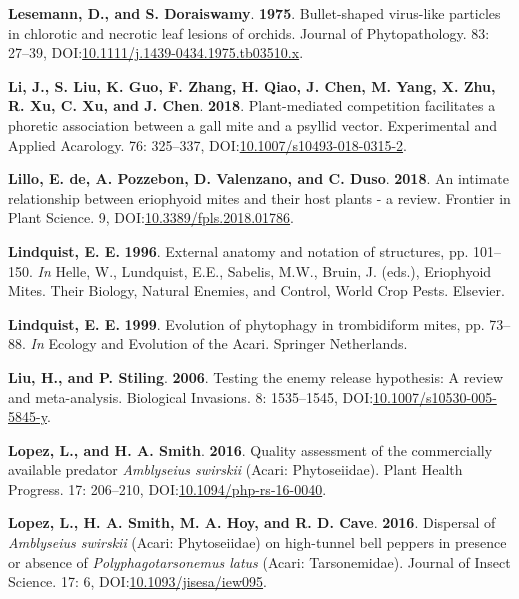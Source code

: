 \documentclass[12pt,final,CPage]{ufthesis}
\newlength{\cslhangindent}
\newenvironment{CSLReferences}[2] %
{%
	\setlength{\parindent}{0pt}
	\ifodd #1 \everypar{\setlength{\hangindent}{\cslhangindent}}\ignorespaces\fi
	\ifnum #2 > 0
	\setlength{\parskip}{#2\baselineskip}
	\fi
}%
{}
\begin{document}
{\begin{CSLReferences}{1}{0}
  \leavevmode{}%
  \textbf{Lesemann, D., and S. Doraiswamy}. \textbf{1975}. Bullet-shaped virus-like particles in chlorotic and necrotic leaf lesions of orchids. Journal of Phytopathology. 83: 27--39, DOI:\href{https://doi.org/10.1111/j.1439-0434.1975.tb03510.x}{10.1111/j.1439-0434.1975.tb03510.x}.

  \leavevmode{}%
  \textbf{Li, J., S. Liu, K. Guo, F. Zhang, H. Qiao, J. Chen, M. Yang, X. Zhu, R. Xu, C. Xu, and J. Chen}. \textbf{2018}. Plant-mediated competition facilitates a phoretic association between a gall mite and a psyllid vector. Experimental and Applied Acarology. 76: 325--337, DOI:\href{https://doi.org/10.1007/s10493-018-0315-2}{10.1007/s10493-018-0315-2}.

  \leavevmode{}%
  \textbf{Lillo, E. de, A. Pozzebon, D. Valenzano, and C. Duso}. \textbf{2018}. An intimate relationship between eriophyoid mites and their host plants - a review. Frontier in Plant Science. 9, DOI:\href{https://doi.org/10.3389/fpls.2018.01786}{10.3389/fpls.2018.01786}.

  \leavevmode{}%
  \textbf{Lindquist, E. E.} \textbf{1996}. External anatomy and notation of structures, pp. 101--150. \emph{In} Helle, W., Lundquist, E.E., Sabelis, M.W., Bruin, J. (eds.), Eriophyoid Mites. Their Biology, Natural Enemies, and Control, World Crop Pests. Elsevier.

  \leavevmode{}%
  \textbf{Lindquist, E. E.} \textbf{1999}. Evolution of phytophagy in trombidiform mites, pp. 73--88. \emph{In} Ecology and Evolution of the Acari. Springer Netherlands.

  \leavevmode{}%
  \textbf{Liu, H., and P. Stiling}. \textbf{2006}. Testing the enemy release hypothesis: A review and meta-analysis. Biological Invasions. 8: 1535--1545, DOI:\href{https://doi.org/10.1007/s10530-005-5845-y}{10.1007/s10530-005-5845-y}.

  \leavevmode{}%
  \textbf{Lopez, L., and H. A. Smith}. \textbf{2016}. Quality assessment of the commercially available predator {\emph{Amblyseius swirskii}} ({Acari}: {Phytoseiidae}). Plant Health Progress. 17: 206--210, DOI:\href{https://doi.org/10.1094/php-rs-16-0040}{10.1094/php-rs-16-0040}.

  \leavevmode{}%
  \textbf{Lopez, L., H. A. Smith, M. A. Hoy, and R. D. Cave}. \textbf{2016}. Dispersal of {\emph{Amblyseius swirskii}} ({Acari}: {Phytoseiidae}) on high-tunnel bell peppers in presence or absence of {\emph{Polyphagotarsonemus latus}} ({Acari}: {Tarsonemidae}). Journal of Insect Science. 17: 6, DOI:\href{https://doi.org/10.1093/jisesa/iew095}{10.1093/jisesa/iew095}.


\end{CSLReferences}}
\end{document}
